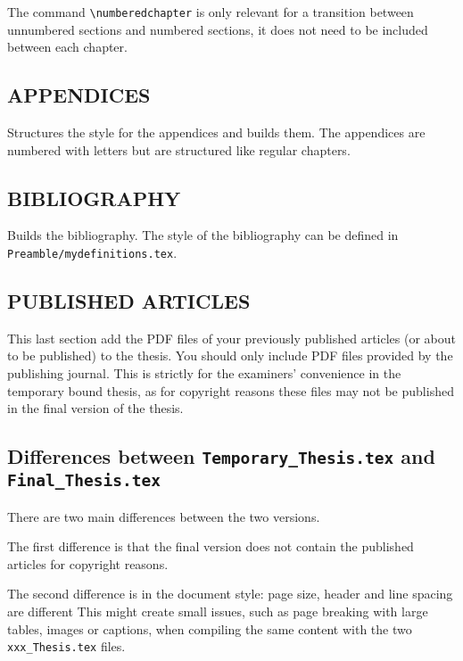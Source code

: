 The command \texttt{\textbackslash numberedchapter} is only relevant for a transition between unnumbered sections and numbered sections, it does not need to be included between each chapter. 

\subsection{APPENDICES}

Structures the style for the appendices and builds them. The appendices are numbered with letters but are structured like regular chapters.

\subsection{BIBLIOGRAPHY}

Builds the bibliography. The style of the bibliography can be defined in \texttt{Preamble/mydefinitions.tex}.

\subsection{PUBLISHED ARTICLES}

This last section add the PDF files of your previously published articles (or about to be published) to the thesis. You should only include PDF files provided by the publishing journal. This is strictly for the examiners' convenience in the temporary bound thesis, as for copyright reasons these files may not be published in the final version of the thesis.

\subsection{Differences between \texttt{Temporary\_Thesis.tex} and  \texttt{Final\_Thesis.tex}}

There are two main differences between the two versions. 

The first difference is that the final version does not contain the published articles for copyright reasons. 

The second difference is in the document style: page size, header and line spacing are different This might create small issues, such as page breaking with large tables, images or captions, when compiling the same content with the two \texttt{xxx\_Thesis.tex} files.



